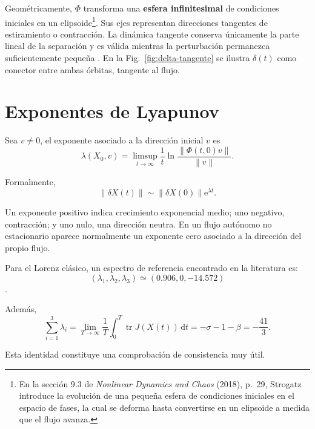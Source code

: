 \documentclass[12pt,a4paper,oneside]{report}
\theoremstyle{definition}
\numberwithin{equation}{chapter}
\newcommand{\dd}{\mathrm{d}}
\newcommand{\e}{\mathrm{e}}
\newcommand{\tr}{\operatorname{tr}}
\newcommand{\norm}[1]{\left\lVert #1\right\rVert}
\begin{document}
Geométricamente, \(\Phi\) transforma una \textbf{esfera infinitesimal} de condiciones iniciales en un elipsoide\footnote{En la sección 9.3 de \textit{Nonlinear Dynamics and Chaos} (2018), p.~29, Strogatz introduce la evolución de una pequeña esfera de condiciones iniciales en el espacio de fases, la cual se deforma hasta convertirse en un elipsoide a medida que el flujo avanza.}. Sus ejes representan direcciones tangentes de estiramiento o contracción. La dinámica tangente conserva únicamente la parte lineal de la separación y es válida mientras la perturbación permanezca suficientemente pequeña \cite{benettin1980}. En la Fig.~\ref{fig:delta-tangente} se ilustra $\delta(t)$ como conector entre ambas órbitas, tangente al flujo.

\chapter{Exponentes de Lyapunov}

Sea \(v\neq0\), el exponente asociado a la dirección inicial \(v\) es
\begin{equation}
    \lambda(X_0,v)= \limsup_{t\to\infty} \frac{1}{t} \ln \frac{\norm{\Phi(t,0)v}}{\norm{v}}.
\end{equation}

Formalmente,
\begin{equation}
    \norm{\delta X(t)} \sim \norm{\delta X(0)}\e^{\lambda t}.
\end{equation}

Un exponente positivo indica crecimiento exponencial medio; uno negativo, contracción; y uno nulo, una dirección neutra. En un flujo autónomo no estacionario aparece normalmente un exponente cero asociado a la dirección del propio flujo.

Para el Lorenz clásico, un espectro de referencia encontrado en la literatura es:
\begin{equation}
    (\lambda_1,\lambda_2,\lambda_3) \simeq(0.906,0,-14.572)
    \label{eq:espectro-ref}
\end{equation}
\cite{sprott2005}. 

Además,
\begin{equation}
    \sum_{i=1}^{3}\lambda_i = \lim_{T\to\infty}\frac1T \int_0^T\tr J(X(t))\,\dd t =-\sigma-1-\beta=-\frac{41}{3}.
    \label{eq:suma}
\end{equation}

Esta identidad constituye una comprobación de consistencia muy útil.
\end{document}
